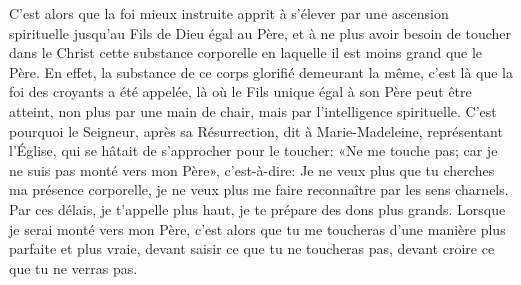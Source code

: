 C’est alors que la foi mieux instruite
		apprit à s’élever par une ascension spirituelle
	jusqu’au Fils de Dieu égal au Père,
	et à ne plus avoir besoin de toucher dans le Christ
		cette substance corporelle en laquelle il est moins grand que le Père.
En effet, la substance de ce corps glorifié demeurant la même,
	c’est là que la foi des croyants a été appelée,
	là où le Fils unique égal à son Père peut être atteint,
	non plus par une main de chair, mais par l’intelligence spirituelle.
C’est pourquoi le Seigneur, après sa Résurrection,
	dit à Marie-Madeleine, représentant l’Église,
	qui se hâtait de s’approcher pour le toucher:
	«Ne me touche pas; car je ne suis pas monté vers mon Père»,
	c’est-à-dire: Je ne veux plus que tu cherches ma présence corporelle,
	je ne veux plus me faire reconnaître par les sens charnels.
Par ces délais, je t’appelle plus haut,
	je te prépare des dons plus grands.
Lorsque je serai monté vers mon Père,
	c’est alors que tu me toucheras d’une manière plus parfaite et plus vraie,
	devant saisir ce que tu ne toucheras pas,
	devant croire ce que tu ne verras pas.
